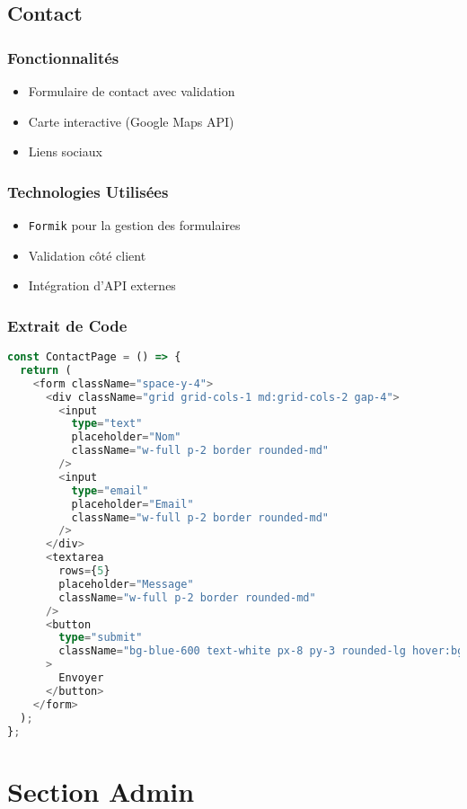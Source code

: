 \documentclass[12pt,a4paper]{report}
\begin{document}
\section{Contact}
\subsection{Fonctionnalités}
\begin{itemize}
\item Formulaire de contact avec validation
\item Carte interactive (Google Maps API)
\item Liens sociaux
\end{itemize}

\subsection{Technologies Utilisées}
\begin{itemize}
\item \texttt{Formik} pour la gestion des formulaires
\item Validation côté client
\item Intégration d'API externes
\end{itemize}

\subsection{Extrait de Code}
\begin{lstlisting}[language=TypeScript,caption=Formulaire Contact]
const ContactPage = () => {
  return (
    <form className="space-y-4">
      <div className="grid grid-cols-1 md:grid-cols-2 gap-4">
        <input 
          type="text" 
          placeholder="Nom" 
          className="w-full p-2 border rounded-md"
        />
        <input 
          type="email" 
          placeholder="Email" 
          className="w-full p-2 border rounded-md"
        />
      </div>
      <textarea 
        rows={5} 
        placeholder="Message" 
        className="w-full p-2 border rounded-md"
      />
      <button 
        type="submit" 
        className="bg-blue-600 text-white px-8 py-3 rounded-lg hover:bg-blue-700 transition-colors"
      >
        Envoyer
      </button>
    </form>
  );
};
\end{lstlisting}

\chapter{Section Admin}
\end{document}
